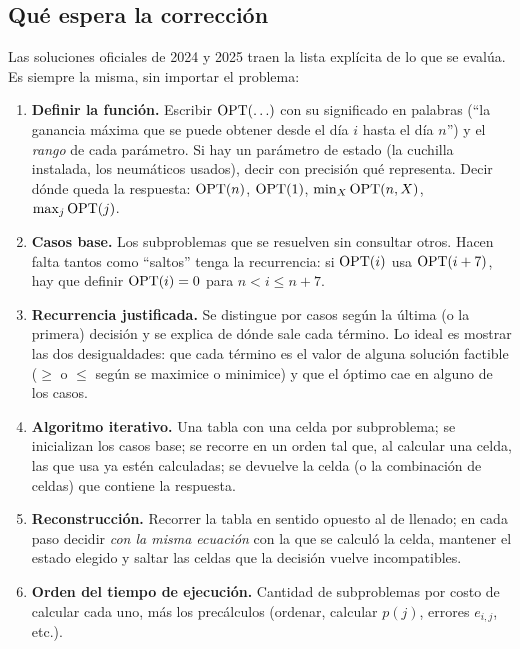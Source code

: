 \subsection{Qué espera la corrección}

Las soluciones oficiales de 2024 y 2025 traen la lista explícita de lo que se
evalúa. Es siempre la misma, sin importar el problema:

\begin{enumerate}[label=\textbf{\arabic*.}]
  \item \textbf{Definir la función.} Escribir $\mathrm{OPT}(\ldots)$ con su
  significado en palabras (``la ganancia máxima que se puede obtener desde el
  día $i$ hasta el día $n$'') y el \emph{rango} de cada parámetro. Si hay un
  parámetro de estado (la cuchilla instalada, los neumáticos usados), decir
  con precisión qué representa. Decir dónde queda la respuesta: $\mathrm{OPT}(n)$,
  $\mathrm{OPT}(1)$, $\min_X \mathrm{OPT}(n,X)$, $\max_j \mathrm{OPT}(j)$.
  \item \textbf{Casos base.} Los subproblemas que se resuelven sin consultar
  otros. Hacen falta tantos como ``saltos'' tenga la recurrencia: si
  $\mathrm{OPT}(i)$ usa $\mathrm{OPT}(i+7)$, hay que definir $\mathrm{OPT}(i)=0$ para
  $n<i\le n+7$.
  \item \textbf{Recurrencia justificada.} Se distingue por casos según la
  última (o la primera) decisión y se explica de dónde sale cada término. Lo
  ideal es mostrar las dos desigualdades: que cada término es el valor de
  alguna solución factible ($\ge$ o $\le$ según se maximice o minimice) y que
  el óptimo cae en alguno de los casos.
  \item \textbf{Algoritmo iterativo.} Una tabla con una celda por
  subproblema; se inicializan los casos base; se recorre en un orden tal que,
  al calcular una celda, las que usa ya estén calculadas; se devuelve la celda
  (o la combinación de celdas) que contiene la respuesta.
  \item \textbf{Reconstrucción.} Recorrer la tabla en sentido opuesto al de
  llenado; en cada paso decidir \emph{con la misma ecuación} con la que se
  calculó la celda, mantener el estado elegido y saltar las celdas que la
  decisión vuelve incompatibles.
  \item \textbf{Orden del tiempo de ejecución.} Cantidad de subproblemas por
  costo de calcular cada uno, más los precálculos (ordenar, calcular
  $p(j)$, errores $e_{i,j}$, etc.).
\end{enumerate}


